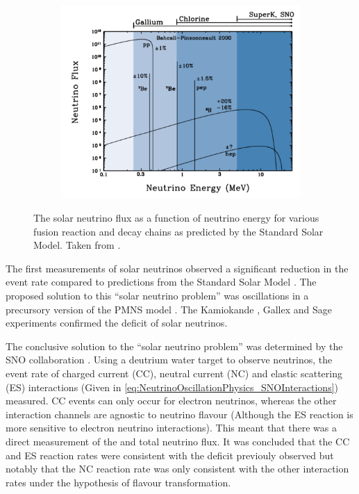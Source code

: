 \begin{figure}[h]
  \begin{subfigure}[t]{0.80\textwidth}
    \includegraphics[width=\textwidth, trim={0mm 0mm 0mm 0mm}, clip,page=1]{Figures/Theory/SolarNeutrinoFlux.pdf}
  \end{subfigure}
  \caption{The solar neutrino flux as a function of neutrino energy for various fusion reaction and decay chains as predicted by the Standard Solar Model. Taken from \cite{Bellerive2004-ur}.}
  \label{fig:NeutrinoOscillationPhysics_SolarNeutrinoFlux}
\end{figure}

The first measurements of solar neutrinos observed a significant reduction in the event rate compared to predictions from the Standard Solar Model \cite{PhysRevLett.20.1205, Vinyoles2017-vv}. The proposed solution to this ``solar neutrino problem'' was  oscillations in a precursory version of the PMNS model \cite{Gribov1969-xi}. The Kamiokande \cite{PhysRevLett.63.16}, Gallex \cite{Hampel1999-of} and Sage \cite{PhysRevC.60.055801} experiments confirmed the  deficit of solar neutrinos.

The conclusive solution to the ``solar neutrino problem'' was determined by the SNO collaboration \cite{Ahmad2002-zv}. Using a deutrium water target to observe  neutrinos, the event rate of charged current (CC), neutral current (NC) and elastic scattering (ES) interactions (Given in \autoref{eq:NeutrinoOscillationPhysics_SNOInteractions}) measured. CC events can only occur for electron neutrinos, whereas the other interaction channels are agnostic to neutrino flavour (Although the ES reaction is more sensitive to electron neutrino interactions). This meant that there was a direct measurement of the  and total neutrino flux. It was concluded that the CC and ES reaction rates were consistent with the deficit previouly observed but notably that the NC reaction rate was only consistent with the other interaction rates under the hypothesis of flavour transformation.

